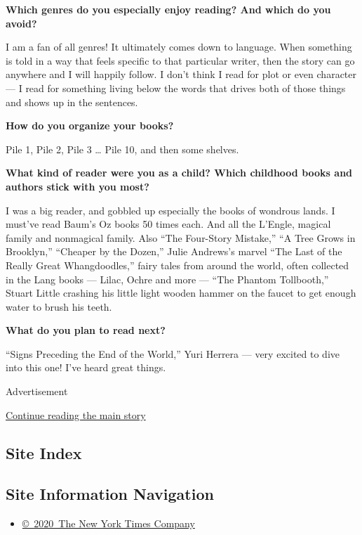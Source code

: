 \textbf{Which genres do you especially enjoy reading? And which do you
avoid?}

I am a fan of all genres! It ultimately comes down to language. When
something is told in a way that feels specific to that particular
writer, then the story can go anywhere and I will happily follow. I
don't think I read for plot or even character --- I read for something
living below the words that drives both of those things and shows up in
the sentences.

\textbf{How do you organize your books?}

Pile 1, Pile 2, Pile 3 \ldots{} Pile 10, and then some shelves.

\textbf{What kind of reader were you as a child? Which childhood books
and authors stick with you most?}

I was a big reader, and gobbled up especially the books of wondrous
lands. I must've read Baum's Oz books 50 times each. And all the
L'Engle, magical family and nonmagical family. Also ``The Four-Story
Mistake,'' ``A Tree Grows in Brooklyn,'' ``Cheaper by the Dozen,'' Julie
Andrews's marvel ``The Last of the Really Great Whangdoodles,'' fairy
tales from around the world, often collected in the Lang books ---
Lilac, Ochre and more --- ``The Phantom Tollbooth,'' Stuart Little
crashing his little light wooden hammer on the faucet to get enough
water to brush his teeth.

\textbf{What do you plan to read next?}

``Signs Preceding the End of the World,'' Yuri Herrera --- very excited
to dive into this one! I've heard great things.

Advertisement

\protect\hyperlink{after-bottom}{Continue reading the main story}

\hypertarget{site-index}{%
\subsection{Site Index}\label{site-index}}

\hypertarget{site-information-navigation}{%
\subsection{Site Information
Navigation}\label{site-information-navigation}}

\begin{itemize}
\tightlist
\item
  \href{https://help.nytimes3xbfgragh.onion/hc/en-us/articles/115014792127-Copyright-notice}{©~2020~The
  New York Times Company}
\end{itemize}

